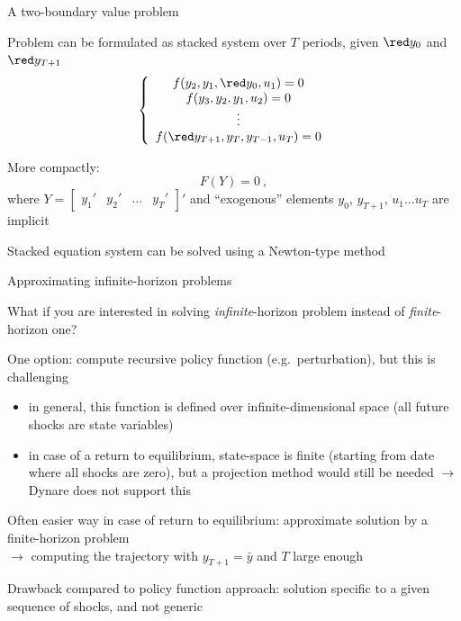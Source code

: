 \documentclass[handout,usepdftitle=false,xcolor=dvipsnames,aspectratio=169]{beamer}
\begin{document}
\begin{frame}{A two-boundary value problem}

  \begin{witemize}
    \item Problem can be formulated as stacked system over $T$ periods, given ${\red y_0}$ and ${\red y_{T+1}}$
    \begin{equation}
      \left\{\begin{array}{c}
        f(y_2,y_1,{\red y_0},u_1)=0 \\
        f(y_3,y_2,y_1,u_2)=0        \\
        \vdots                      \\
        f({\red y_{T+1}},y_T,y_{T-1},u_T)=0
      \end{array}\right.
    \end{equation}
    \item More compactly:
    \begin{equation}
      F(Y) = 0 \: ,
    \end{equation}
    where $Y =
      \left[\begin{array}{llll}y_1'&y_2'&\ldots&y_T'\end{array}\right]'$ and ``exogenous'' elements $y_0$, $y_{T+1}$, $u_1\ldots u_T$ are implicit
    \item Stacked equation system can be solved using a Newton-type method
  \end{witemize}
\end{frame}


\begin{frame}{Approximating infinite-horizon problems}
  \begin{witemize}
    \item What if you are interested in solving \emph{infinite}-horizon problem instead of \emph{finite}-horizon one?
    \item One option: compute recursive policy function (e.g.\
    perturbation), but this is challenging
    \begin{itemize}
      \item in general, this function is defined over infinite-dimensional space
            (all future shocks are state variables)
      \item in case of a return to equilibrium, state-space
            is finite (starting from date where all shocks are zero), but a
            projection method would still be needed
            $\rightarrow$ Dynare does not support this
    \end{itemize}
    \item Often easier way in case of return to equilibrium: approximate solution by a finite-horizon problem\\
    $\rightarrow$ computing the trajectory with $y_{T+1}=\bar y$ and $T$
    large enough
    \item Drawback compared to policy function approach: solution specific to a given sequence of shocks, and not generic
  \end{witemize}
\end{frame}
\end{document}
